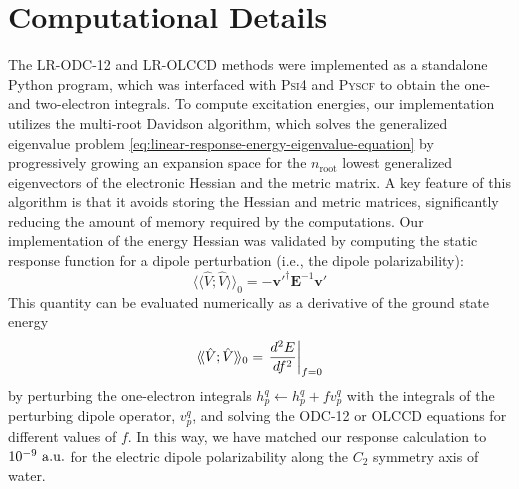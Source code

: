\section{Computational Details}
\label{sec:comp_details}
The LR-ODC-12 and LR-OLCCD methods were implemented as a standalone Python
program, which was interfaced with \textsc{Psi4}\cite{Parrish:2017p3185} and
\textsc{Pyscf}\cite{Sun:2018pe1340} to obtain the one- and two-electron
integrals.
To compute excitation energies, our implementation utilizes the multi-root
Davidson algorithm,\cite{Davidson:1975p87,Liu:1978p49} which solves the
generalized eigenvalue problem
\eqref{eq:linear-response-energy-eigenvalue-equation} by progressively growing
an expansion space for the \(n_\mathrm{root}\) lowest generalized eigenvectors
of the electronic Hessian and the metric matrix.
A key feature of this algorithm is that it avoids storing the Hessian and metric
matrices, significantly reducing the amount of memory required by the
computations.
Our implementation of the energy Hessian was validated by computing the static
response function for a dipole perturbation (i.e., the dipole polarizability):
\begin{equation}
    \langle\!\langle\hat{V}; \hat{V}\rangle\!\rangle_0
    =
    -
    \mathbf{v}'^\dagger
    \mathbf{E}^{-1}
    \mathbf{v}'
\end{equation}
This quantity can be evaluated numerically as a derivative of the ground state
energy
\begin{equation}
    \langle\!\langle\hat{V}; \hat{V}\rangle\!\rangle_0
    =
    \left.
    \frac{%
        d^2 E
    }{%
        df^2
    }
    \right|_{f=0}
\end{equation}
by perturbing the one-electron integrals
\(
    h_p^q
    \leftarrow
    h_p^q
    +
    f
    v_p^q
\)
with the integrals of the perturbing dipole operator, \(v_p^q\), and solving the
ODC-12 or OLCCD equations for different values of \(f\).
In this way, we have matched our response calculation to \(10^{-9}\ \mathrm{a.u.}\) for
the electric dipole polarizability along the \(C_2\) symmetry axis of water.


